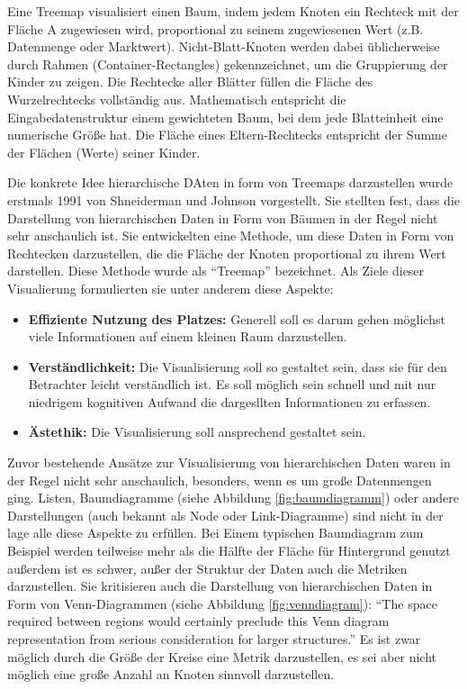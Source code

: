 Eine Treemap visualisiert einen Baum, indem jedem Knoten ein Rechteck mit der Fläche A zugewiesen wird, proportional zu seinem zugewiesenen Wert (z.B. Datenmenge oder Marktwert). Nicht-Blatt-Knoten werden dabei üblicherweise durch Rahmen (Container-Rectangles) gekennzeichnet, um die Gruppierung der Kinder zu zeigen. \cite{bruls2000squarified} Die Rechtecke aller Blätter füllen die Fläche des Wurzelrechtecks vollständig aus. Mathematisch entspricht die Eingabedatenstruktur einem gewichteten Baum, bei dem jede Blatteinheit eine numerische Größe hat. Die Fläche eines Eltern-Rechtecks entspricht der Summe der Flächen (Werte) seiner Kinder.

Die konkrete Idee hierarchische DAten in form von Treemaps darzustellen wurde erstmals 1991 von Shneiderman und Johnson \cite{johnson1991tree} vorgestellt. Sie stellten fest, dass die Darstellung von hierarchischen Daten in Form von Bäumen in der Regel nicht sehr anschaulich ist. Sie entwickelten eine Methode, um diese Daten in Form von Rechtecken darzustellen, die die Fläche der Knoten proportional zu ihrem Wert darstellen. Diese Methode wurde als \enquote{Treemap} bezeichnet. Als Ziele dieser Visualierung formulierten sie unter anderem diese Aspekte:
\begin{itemize}
    \item \textbf{Effiziente Nutzung des Platzes:} Generell soll es darum gehen möglichst viele Informationen auf einem kleinen Raum darzustellen.
    \item \textbf{Verständlichkeit:} Die Visualisierung soll so gestaltet sein, dass sie für den Betrachter leicht verständlich ist. Es soll möglich sein schnell und mit nur niedrigem kognitiven Aufwand die dargesllten Informationen zu erfassen.
    \item \textbf{Ästethik:} Die Visualisierung soll ansprechend gestaltet sein.
\end{itemize}

Zuvor bestehende Ansätze zur Visualisierung von hierarchischen Daten waren in der Regel nicht sehr anschaulich, besonders, wenn es um große Datenmengen ging. Listen, Baumdiagramme (siehe Abbildung \ref{fig:baumdiagramm}) oder andere Darstellungen (auch bekannt als Node oder Link-Diagramme) sind nicht in der lage alle diese Aspekte zu erfüllen. Bei Einem typischen Baumdiagram zum Beispiel werden teilweise mehr als die Hälfte der Fläche für Hintergrund genutzt \cite[3]{johnson1991tree} außerdem ist es schwer, außer der Struktur der Daten auch die Metriken darzustellen. Sie kritisieren auch die Darstellung von hierarchischen Daten in Form von Venn-Diagrammen (siehe Abbildung \ref{fig:venndiagram}): \enquote{The space required between regions would certainly preclude this Venn diagram representation from serious consideration for larger structures.}\cite[5]{johnson1991tree} Es ist zwar möglich durch die Größe der Kreise eine Metrik darzustellen, es sei aber nicht möglich eine große Anzahl an Knoten sinnvoll darzustellen. 

